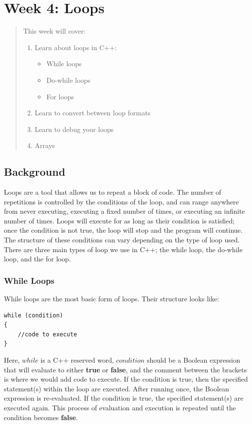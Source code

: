 \chapter*{Week 4: Loops}
\setcounter{chapter}{4}
\setcounter{section}{0}

\begin{abstract}
This week will cover:
\begin{enumerate}
    \item Learn about loops in C++:
    \begin{itemize}
        \item While loops
        \item Do-while loops
        \item For loops
    \end{itemize}
    \item Learn to convert between loop formats
    \item Learn to debug your loops
    \item Arrays
\end{enumerate}
    
\end{abstract}

\section{Background}
Loops are a tool that allows us to repeat a block of code. The number of repetitions is controlled by the conditions of the loop, and can range anywhere from never executing, executing a fixed number of times, or executing an infinite number of times. Loops will execute for as long as their condition is satisfied; once the condition is not true, the loop will stop and the program will continue. The structure of these conditions can vary depending on the type of loop used. There are three main types of loop we use in C++; the while loop, the do-while loop, and the for loop.

\subsection{While Loops}
While loops are the most basic form of loops. Their structure looks like:

\begin{verbatim}
while (condition)
{
    //code to execute
}
\end{verbatim}

Here, $while$ is a C++ reserved word, $condition$ should be a Boolean expression that will evaluate to either \textbf{true} or \textbf{false}, and the comment between the brackets is where we would add code to execute. If the condition is true, then the specified statement(s) within the loop are executed. After running once, the Boolean expression is re-evaluated. If the condition is true, the specified statement(s) are executed again. This process of evaluation and execution is repeated until the condition becomes \textbf{false}.

